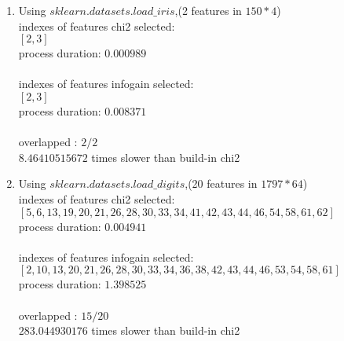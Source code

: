 \documentclass{article}
\begin{document}
	 \begin{enumerate}
	 \item {Using $sklearn.datasets.load\_iris$,(2 features in $150 * 4$)}
	  {\\indexes of features chi2 selected:\\     
$[2,3]$ \\
process duration: $0.000989$\\
\\
indexes of features infogain selected:\\
$[2,3]$\\
process duration: $0.008371$\\
\\
overlapped : $2 / 2$\\
$8.46410515672 $ times slower than build-in  chi2}
	 \item {Using $sklearn.datasets.load\_digits$,(20 features in $1797 * 64$)}
	 {\\indexes of features chi2 selected:\\     
$[5, 6, 13, 19, 20, 21, 26, 28, 30, 33, 34, 41, 42, 43, 44, 46, 54, 58, 61, 62]$ \\
process duration: $0.004941$\\
\\
indexes of features infogain selected:\\
$[2, 10, 13, 20, 21, 26, 28, 30, 33, 34, 36, 38, 42, 43, 44, 46, 53, 54, 58, 61]$\\
process duration: $1.398525$\\
\\
overlapped : $15 / 20$\\
$283.044930176 $ times slower than build-in  chi2}
	 \end{enumerate}
\end{document}
